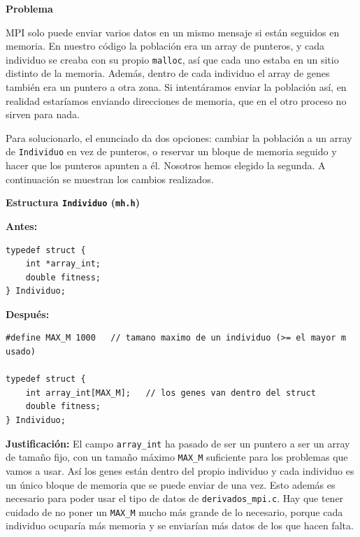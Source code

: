 \documentclass[12pt]{article}
\begin{document}
\begin{enumerate}


\medskip
\noindent\textbf{Problema}\par
\smallskip

MPI solo puede enviar varios datos en un mismo mensaje si están seguidos en memoria. En nuestro código la población era un array de punteros, y cada individuo se creaba con su propio \texttt{malloc}, así que cada uno estaba en un sitio distinto de la memoria. Además, dentro de cada individuo el array de genes también era un puntero a otra zona. Si intentáramos enviar la población así, en realidad estaríamos enviando direcciones de memoria, que en el otro proceso no sirven para nada.

Para solucionarlo, el enunciado da dos opciones: cambiar la población a un array de \texttt{Individuo} en vez de punteros, o reservar un bloque de memoria seguido y hacer que los punteros apunten a él. Nosotros hemos elegido la segunda. A continuación se muestran los cambios realizados.



\medskip
\noindent\textbf{Estructura \texttt{Individuo} (\texttt{mh.h})}\par
\smallskip

\noindent\textbf{Antes:}
\begin{lstlisting}[style=EstiloC]
typedef struct {
    int *array_int;
    double fitness;
} Individuo;
\end{lstlisting}

\noindent\textbf{Después:}
\begin{lstlisting}[style=EstiloC]
#define MAX_M 1000   // tamano maximo de un individuo (>= el mayor m usado)

typedef struct {
    int array_int[MAX_M];   // los genes van dentro del struct
    double fitness;
} Individuo;
\end{lstlisting}

\textbf{Justificación:} El campo \texttt{array\_int} ha pasado de ser un puntero a ser un array de tamaño fijo, con un tamaño máximo \texttt{MAX\_M} suficiente para los problemas que vamos a usar. Así los genes están dentro del propio individuo y cada individuo es un único bloque de memoria que se puede enviar de una vez. Esto además es necesario para poder usar el tipo de datos de \texttt{derivados\_mpi.c}. Hay que tener cuidado de no poner un \texttt{MAX\_M} mucho más grande de lo necesario, porque cada individuo ocuparía más memoria y se enviarían más datos de los que hacen falta.


\end{enumerate}
\end{document}
